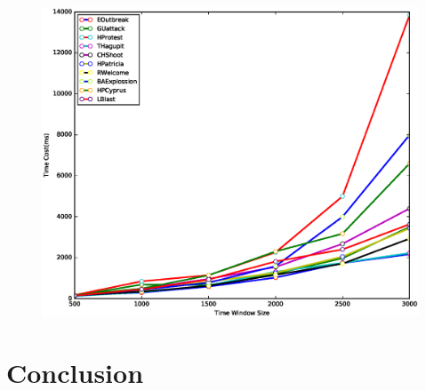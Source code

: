 \documentclass{llncs}
\begin{document}
\begin{figure}
    \centering
    \includegraphics[scale=0.5]{window-timecost.eps}

\end{figure}

\section{Conclusion}\label{sec:conclusion}
\end{document}

